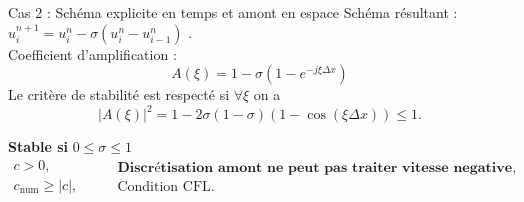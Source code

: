 \documentclass[aspectratio=169, french]{beamer}
\begin{document}
\begin{frame}{Cas 2 : Schéma explicite en temps et amont en espace}
	Schéma résultant : 
	$u_{i}^{n+1} = u_{i}^n - \sigma(u_{i}^n - u_{i-1}^n)$ . \\
	\vspace{.5cm}
	Coefficient d'amplification :
	\begin{equation*}
		A(\xi) = 1 - \sigma(1- e^{-j  \xi \Delta x})
	\end{equation*}
	Le critère de stabilité est respecté si $\forall \xi$ on a
	\begin{equation*}
		|A(\xi)|^2 = 1 - 2 \sigma(1-\sigma)(1 - \cos(\xi \Delta x))\le 1.
	\end{equation*}
	
	\begin{tcolorbox}[title=Conditions de stabilité, coltitle=white]
	\textbf{Stable si }   $0 \le \sigma \le 1$
	\begin{equation*}
		\begin{aligned}
			c>0, \\
			c_{\mathrm{num}}\ge|c|, 
		\end{aligned}
		\qquad 
		\begin{aligned}
			\textbf{Discrétisation amont ne peut pas traiter vitesse negative}, \\
			\text{Condition CFL.}
		\end{aligned}
	\end{equation*}
		
	\end{tcolorbox}
	
\end{frame}
\end{document}
